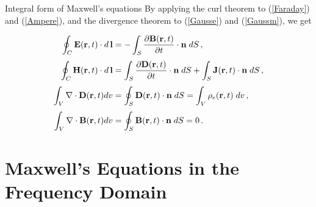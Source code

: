 \documentclass[handout,10pt]{beamer}
\begin{document}

\begin{frame}[fragile]{Integral form of Maxwell's equations}
By applying the curl theorem to (\ref{Faraday}) and
(\ref{Ampere}), and the divergence theorem to (\ref{Gausse}) and
(\ref{Gaussm}), we get

%
\begin{subequations}
\begin{align}
  \oint_{C} {\mathbf{E}}({\mathbf{r}},t) \cdot d\,{\mathbf{l}}   & =
- \int_{S}{\partial {\mathbf{B}}({\mathbf{r}},t) \over \partial t} \cdot
{\mathbf{n}} \; dS\,,
  \label{intinduction}
\\[1mm]
  \oint_{C} {\mathbf{H}}({\mathbf{r}},t) \cdot d\, \mathbf{l}   & =
\int_{S}{\partial {\mathbf{D}}({\mathbf{r}},t) \over \partial t} \cdot
{\mathbf{n}} \; dS + \int_{S}{{\mathbf{J}}({\mathbf{r}},t)} \cdot {\mathbf{n}}
\; dS \,,
  \label{intAmpere}
\\[1mm]
 \int_{V} \nabla \cdot {\mathbf{D}}({\mathbf{r}},t) dv   & =
\oint_{S}{\mathbf{D}}({\mathbf{r}},t) \cdot {\mathbf{n}} \; dS = \int_{V}
\rho_e ({\mathbf{r}},t) \; dv \,,
  \label{intGausse}
\\[1mm]
 \int_{V} \nabla \cdot {\mathbf{B}}({\mathbf{r}},t) dv   & =
\oint_{S}{\mathbf{B}}({\mathbf{r}},t) \cdot {\mathbf{n}} \; dS =0 \,.
  \label{intGaussm}
\end{align}
\end{subequations}

\end{frame}



\section{Maxwell's Equations in the Frequency Domain}
\end{document}
